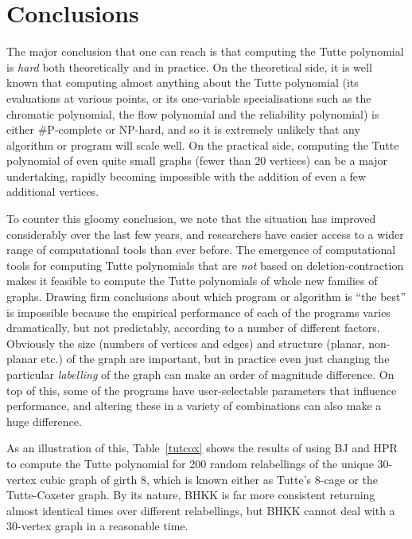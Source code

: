 

\section{Conclusions}  

The major conclusion that one can reach is that computing the Tutte polynomial is \emph{hard} both theoretically and in 
practice. On the theoretical side, it is well known that computing almost anything about the Tutte polynomial (its evaluations at various points, or its one-variable specialisations such as the chromatic polynomial, the flow polynomial and the reliability polynomial) is either \#P-complete or NP-hard, and so it is extremely unlikely that any algorithm or program will scale well. On the practical side, computing the Tutte polynomial of even quite small graphs (fewer than $20$ vertices) can be a major undertaking, rapidly becoming impossible with the addition of even a few additional vertices.

To counter this gloomy conclusion, we note that the situation has improved considerably over the last few years, and researchers 
have easier access to a wider range of computational tools than ever before. The emergence of computational tools for computing
Tutte polynomials that are \emph{not} based on deletion-contraction makes it feasible to compute the Tutte polynomials of
whole new families of graphs.   Drawing firm conclusions about which program or algorithm is ``the best'' is impossible because the empirical performance of each of the programs varies dramatically, but not predictably, according to a number of different factors. Obviously the size (numbers of vertices and edges) and structure (planar, non-planar etc.) of the graph are important, but in practice even just changing the particular {\em labelling} of the graph can make an order of magnitude difference. On top of this, some of the programs have user-selectable parameters that influence performance, and altering these in a variety of combinations can also make a huge difference.

As an illustration of this, Table~\ref{tutcox} shows the results of using BJ and HPR to compute the Tutte polynomial for 200 random relabellings of the unique 30-vertex cubic graph of girth 8, which is known either as Tutte's 8-cage or the Tutte-Coxeter graph. By its nature, BHKK is far more consistent returning almost identical times over different relabellings, but BHKK cannot deal with a 30-vertex graph in a reasonable time.

